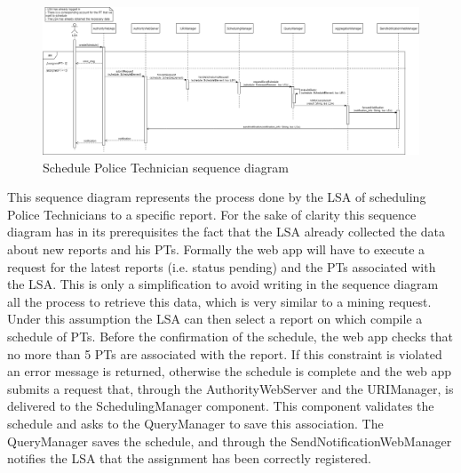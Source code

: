 \begin{figure}[H]
  \centering
  \includegraphics[width=1\textwidth]{Images/UML_diagrams/Sequence_Diagrams/Schedule_PT_sd.png}
  \caption{Schedule Police Technician sequence diagram}
  \label{fig:schedule_PT_sd}
\end{figure}
This sequence diagram represents the process done by the LSA of scheduling Police Technicians to a specific report. For the sake of clarity this sequence diagram has in its prerequisites the fact that the LSA already collected the data about new reports and his PTs. Formally the web app will have to execute a request for the latest reports (i.e. status pending) and the PTs associated with the LSA. This is only a simplification to avoid writing in the sequence diagram all the process to retrieve this data, which is very similar to a mining request. Under this assumption the LSA can then select a report on which compile a schedule of PTs. Before the confirmation of the schedule, the web app checks that no more than 5 PTs are associated with the report. If this constraint is violated an error message is returned, otherwise the schedule is complete and the web app submits a request that, through the AuthorityWebServer and the URIManager, is delivered to the SchedulingManager component. This component validates the schedule and asks to the QueryManager to save this association. The QueryManager saves the schedule, and through the SendNotificationWebManager notifies the LSA that the assignment has been correctly registered.
